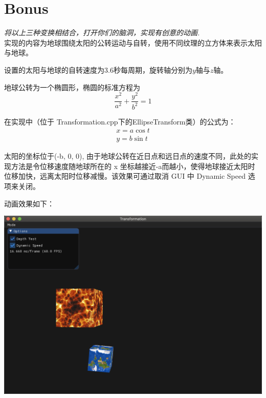 \documentclass[12pt]{article}
\begin{document}
\section{Bonus}
    \emph{将以上三种变换相结合，打开你们的脑洞，实现有创意的动画.}
    \\[20pt]
    \indent 实现的内容为地球围绕太阳的公转运动与自转，使用不同纹理的立方体来表示太阳与地球。

    设置的太阳与地球的自转速度为3.6秒每周期，旋转轴分别为$y$轴与$z$轴。

    地球公转为一个椭圆形，椭圆的标准方程为
    \begin{equation}
        \frac{x^2}{a^2} + \frac{y^2}{b^2}=1
    \end{equation}

    在实现中（位于 Transformation.cpp下的EllipseTransform类）的公式为：
    \begin{equation}
        \begin{aligned}
            x = a\cos t\\
            y = b\sin t
        \end{aligned}
    \end{equation}

    太阳的坐标位于(-b, 0, 0), 由于地球公转在近日点和远日点的速度不同，此处的实现方法是令位移速度随地球所在的 x 坐标越接近-a而越小，使得地球接近太阳时位移加快，远离太阳时位移减慢。该效果可通过取消 GUI 中 Dynamic Speed 选项来关闭。

    动画效果如下：
    \begin{center}
        \includegraphics[scale=0.4]{orbit.png}
    \end{center}
\end{document}
